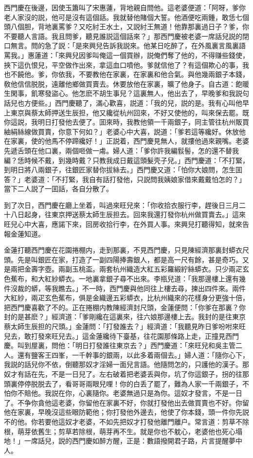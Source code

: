 西門慶在後邊，因使玉簫叫了宋惠蓮，背地親自問他。這老婆便道：「阿呀，爹你老人家沒的説，他可是沒有這個話。我就替他賭個大誓。他酒便吃兩鍾，敢恁七個頭八個胆，背地裏罵爹？又吃紂王水土，又説紂王無道！他靠那裏過日子？爹，你不要聽人言語。我且問爹，聽見誰説這個話來？」那西門慶被老婆一席話兒説的閉口無言。問的急了説：「是來興兒告訴我説來。他某日吃醉了，在外風裏言風裏語罵我。」惠蓮道：「來興兒因爹叫俺這一個買辦，説俺們奪了他的，不得赚些錢使，挾下這仇恨兒，平空做作出來，拿這血口噴他。爹就信他了？有這個欺心的事，我也不饒他。爹，你依我，不要教他在家裏，在家裏和他合氣。與他幾兩銀子本錢，敎他信信脱脱，遠離他鄉做買賣去。休要放他在家裏，曠了他身子。自古道：飽暖生閑事，飢寒發盜心。他怎麽不胡生事兒？這裏無人，他出去了，早晚爹和我説句話兒也方便些。」西門慶聽了，滿心歡喜，説道：「我的兒，説的是。我有心叫他早上東京與蔡太師押送生辰担，他又纔從杭州回來，不好又使他的，叫來保去罷。既你這説，我明日打發他去便了。囬來時，我教他領一千兩銀子，同主管往杭州販買紬絹絲線做買賣，你意下何如？」老婆心中大喜，説道：「爹若這等纔好。休放他在家裏，使的他馬不停蹄纔好！」正説着，西門慶見無人，就摟他過來親嘴。老婆先遞舌頭在他口裏，兩個咂做一䖏。婦人道：「爹你許我編䯼髻，怎的還不替我編？恁時候不戴，到幾時戴？只教我成日戴這頭髮壳子兒。」西門慶道：「不打緊，到明日將八兩銀子，往銀匠家替你拔絲去。」西門慶又道：「怕你大娘問，怎生囬答？」老婆道：「不打緊，我自有話打發他，只説問我姨娘家借來戴戴怕怎的？」當下二人説了一囬話，各自分散了。

到了次日，西門慶在廳上坐着，叫過來旺兒來：「你收拾衣服行李，趕後日三月二十八日起身，往東京押送蔡太師生辰担去。回來我還打發你杭州做買賣去。」這來旺兒心中大喜，應諾下來，回房收拾行李，在外買人事。來興兒打聽得知，就來告報金蓮知道。

金蓮打聽西門慶在花園捲棚内，走到那裏，不見西門慶，只見陳經濟那裏封蟒衣尺頭。先是叫銀匠在家，打造了一副四陽捧壽銀人，都是高一尺有餘，甚是奇巧。又是兩把金壽字壺。兩副玉桃盃。兩套杭州織造大紅五彩羅緞紵絲蟒衣。只少兩疋玄色蕉布，和大紅紗蟒衣。一地裏拿銀子尋不出來。李瓶兒道：「我那邊樓上還有幾件沒裁的蟒，等我瞧去。」不一時，西門慶與他同往上樓去尋，揀出四件來。兩件大紅紗，兩疋玄色蕉布，俱是金織邊五彩蟒衣，比杭州織來的花樣身分更強十倍，把西門慶喜歡了不的。正在捲棚内教陳經濟封尺頭，金蓮便問：「你爹在那裏？你封的是甚麽？」經濟道：「爹剛纔在這裏來，往六娘那邊樓上去。我封的是往東京蔡太師生辰担的尺頭。」金蓮問：「打發誰去？」經濟道：「我聽見昨日爹吩咐來旺兒去，敢打發來旺兒去。」這金蓮纔待下臺基，往花園那條路上走，正撞見西門慶。叫到屋裏，問他：「明日打發誰往東京去？」西門慶道：「來旺兒和吳主管二人。還有鹽客王四峯，一千幹事的銀兩，以此多着兩個去。」婦人道：「隨你心下，我説的話兒你不依，倒聽那奴才淫婦一面兒言語。他隨問怎的，只護他的漢子。那奴才有話在先，不是一日兒了。左右破着把老婆丢與你，坑了你這銀子，拐的往那頭裏停停脱脱去了，看哥哥兩眼兒哩！你的白丢了罷了，難為人家一千兩銀子，不怕你不賠他。我説在你，心裏隨你。老婆無過只是為你。這奴才發言，不是一日了。不争你貪他這老婆，你留他在家裏不好，你就打發他出去做買賣也不好。你留他在家裏，早晚沒這些眼防範他；你打發他外邊去，他使了你本錢，頭一件你先説不的他。你若要他這奴才老婆，不如先把奴才打發他離門離户。常言道：剪草不除根，萌芽依舊生；剪草若除根，萌芽再不生。就是你也不躭心，老婆他也死心塌地！」一席話兒，説的西門慶如醉方醒，正是：數語撥開君子路，片言提醒夢中人。

